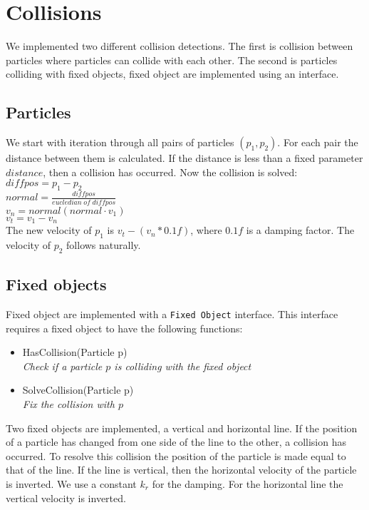 \section{Collisions}
We implemented two different collision detections.
The first is collision between particles where particles can collide with each other.
The second is particles colliding with fixed objects, fixed object are implemented using an interface.

\subsection{Particles}
We start with iteration through all pairs of particles $(p_1, p_2)$.
For each pair the distance between them is calculated.
If the distance is less than a fixed parameter $distance$, then a collision has occurred.
Now the collision is solved:\\
$diffpos = p_1 - p_2$\\
$normal = \frac{diffpos}{eucledian\;of\;diffpos}$\\
$v_n = normal (normal \cdot v_1)$\\
$v_t = v_1 - v_n$\\
The new velocity of $p_1$ is $v_t - (v_n * 0.1f)$, where $0.1f$ is a damping factor.
The velocity of $p_2$ follows naturally.

\subsection{Fixed objects}
Fixed object are implemented with a \verb"Fixed Object" interface.
This interface requires a fixed object to have the following functions:
\begin{itemize}
  \item HasCollision(Particle p)\\
  \emph{ Check if a particle $p$ is colliding with the fixed object }
  \item SolveCollision(Particle p)\\
  \emph{ Fix the collision with $p$ }
\end{itemize}
Two fixed objects are implemented, a vertical and horizontal line.
If the position of a particle has changed from one side of the line to the other, a collision has occurred.
To resolve this collision the position of the particle is made equal to that of the line.
If the line is vertical, then the horizontal velocity of the particle is inverted.
We use a constant $k_r$ for the damping.
For the horizontal line the vertical velocity is inverted.

 